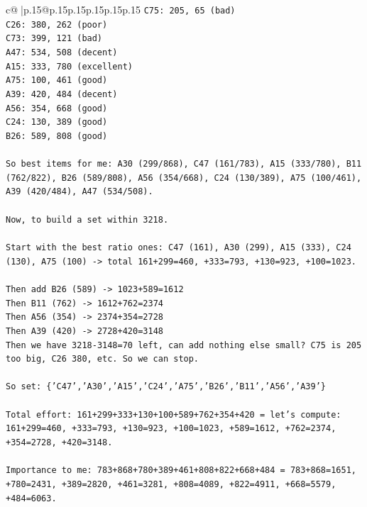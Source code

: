 \documentclass{article}
\begin{document}
{\begin{supertabular}{c@{$\;$}|p{.15\linewidth}@{}p{.15\linewidth}p{.15\linewidth}p{.15\linewidth}p{.15\linewidth}p{.15\linewidth}}
{{{\texttt{C75: 205, 65 (bad)} \\
\texttt{C26: 380, 262 (poor)} \\
\texttt{C73: 399, 121 (bad)} \\
\texttt{A47: 534, 508 (decent)} \\
\texttt{A15: 333, 780 (excellent)} \\
\texttt{A75: 100, 461 (good)} \\
\texttt{A39: 420, 484 (decent)} \\
\texttt{A56: 354, 668 (good)} \\
\texttt{C24: 130, 389 (good)} \\
\texttt{B26: 589, 808 (good)} \\
\\ 
\texttt{So best items for me: A30 (299/868), C47 (161/783), A15 (333/780), B11 (762/822), B26 (589/808), A56 (354/668), C24 (130/389), A75 (100/461), A39 (420/484), A47 (534/508).} \\
\\ 
\texttt{Now, to build a set within 3218.} \\
\\ 
\texttt{Start with the best ratio ones: C47 (161), A30 (299), A15 (333), C24 (130), A75 (100) {-}> total 161+299=460, +333=793, +130=923, +100=1023.} \\
\\ 
\texttt{Then add B26 (589) {-}> 1023+589=1612} \\
\texttt{Then B11 (762) {-}> 1612+762=2374} \\
\texttt{Then A56 (354) {-}> 2374+354=2728} \\
\texttt{Then A39 (420) {-}> 2728+420=3148} \\
\texttt{Then we have 3218{-}3148=70 left, can add nothing else small? C75 is 205 too big, C26 380, etc. So we can stop.} \\
\\ 
\texttt{So set: \{'C47','A30','A15','C24','A75','B26','B11','A56','A39'\}} \\
\\ 
\texttt{Total effort: 161+299+333+130+100+589+762+354+420 = let's compute: 161+299=460, +333=793, +130=923, +100=1023, +589=1612, +762=2374, +354=2728, +420=3148.} \\
\\ 
\texttt{Importance to me: 783+868+780+389+461+808+822+668+484 = 783+868=1651, +780=2431, +389=2820, +461=3281, +808=4089, +822=4911, +668=5579, +484=6063.} \\
\\ 
}}}
\end{supertabular}}
\end{document}
